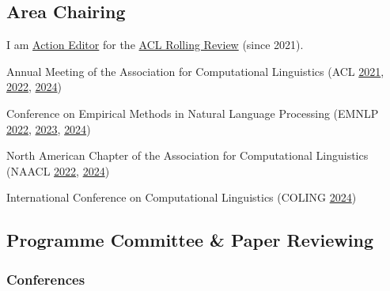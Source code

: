 \subsection*{Area Chairing}

I am \href{https://aclrollingreview.org/aes}{Action Editor} for the \href{https://aclrollingreview.org/}{ACL Rolling Review} (since 2021).

\vspace{.5em}

\begin{itemize*}[label={},
                 itemjoin={{,\space}},
                 afterlabel={},
                 after={{.}}]

    \item Annual Meeting of the Association for Computational Linguistics
    (ACL
    \href{https://aclanthology.org/2021.acl-long.0.pdf}{2021},
    \href{https://aclanthology.org/2022.acl-long.0.pdf}{2022},
    \href{https://aclanthology.org/2024.acl-long.0.pdf}{2024})

    \item Conference on Empirical Methods in Natural Language Processing
    (EMNLP 
    \href{https://aclanthology.org/2022.emnlp-main.0.pdf}{2022},
    \href{https://aclanthology.org/2023.emnlp-main.0.pdf}{2023},
    \href{https://aclanthology.org/2024.emnlp-main.0.pdf}{2024})

    \item North American Chapter of the Association for Computational Linguistics 
    (NAACL
    \href{https://aclanthology.org/2022.naacl-main.0.pdf}{2022},
    \href{https://aclanthology.org/2024.naacl-long.0.pdf}{2024})

    \item International Conference on Computational Linguistics
    (COLING
    \href{https://aclanthology.org/2024.lrec-main.0.pdf}{2024})
    
\end{itemize*}

\subsection*{Programme Committee \& Paper Reviewing}

\subsubsection*{Conferences}


